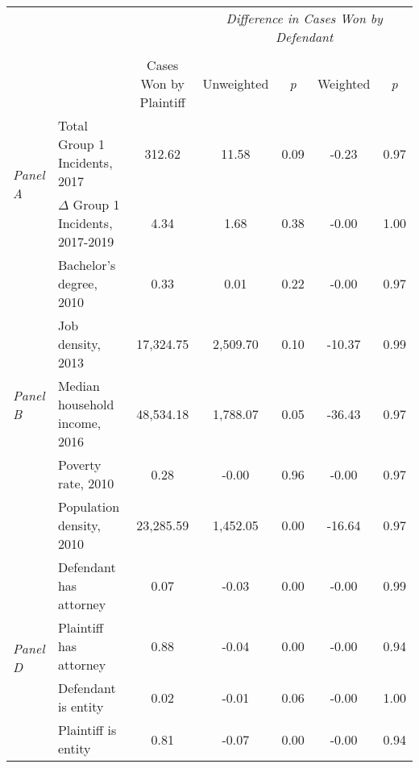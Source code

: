 \begin{tabular}{llccccc}
\toprule
 &  & \textit{} & \multicolumn{4}{c}{\textit{Difference in Cases Won by Defendant}} \\
\cline{4-7}
\\
 &  & Cases Won by Plaintiff & Unweighted & \emph{p} & Weighted & \emph{p} \\
\midrule
\multirow[c]{2}{3cm}{\textit{Panel A}} & Total Group 1 Incidents, 2017 & 312.62 & 11.58 & 0.09 & -0.23 & 0.97 \\
 & $\Delta$ Group 1 Incidents, 2017-2019 & 4.34 & 1.68 & 0.38 & -0.00 & 1.00 \\
\cline{1-7}
\multirow[c]{5}{3cm}{\textit{Panel B}} & Bachelor's degree, 2010 & 0.33 & 0.01 & 0.22 & -0.00 & 0.97 \\
 & Job density, 2013 & 17,324.75 & 2,509.70 & 0.10 & -10.37 & 0.99 \\
 & Median household income, 2016 & 48,534.18 & 1,788.07 & 0.05 & -36.43 & 0.97 \\
 & Poverty rate, 2010 & 0.28 & -0.00 & 0.96 & -0.00 & 0.97 \\
 & Population density, 2010 & 23,285.59 & 1,452.05 & 0.00 & -16.64 & 0.97 \\
\cline{1-7}
\multirow[c]{4}{3cm}{\textit{Panel D}} & Defendant has attorney & 0.07 & -0.03 & 0.00 & -0.00 & 0.99 \\
 & Plaintiff has attorney & 0.88 & -0.04 & 0.00 & -0.00 & 0.94 \\
 & Defendant is entity & 0.02 & -0.01 & 0.06 & -0.00 & 1.00 \\
 & Plaintiff is entity & 0.81 & -0.07 & 0.00 & -0.00 & 0.94 \\
\cline{1-7}
\bottomrule
\end{tabular}
